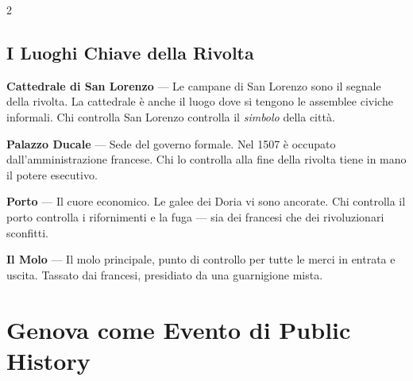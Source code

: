 \begin{multicols}{2}

\subsection{I Luoghi Chiave della Rivolta}


\textbf{Cattedrale di San Lorenzo} — Le campane di San Lorenzo sono
il segnale della rivolta. La cattedrale è anche il luogo dove si tengono
le assemblee civiche informali. Chi controlla San Lorenzo controlla il
\textit{simbolo} della città.


\textbf{Palazzo Ducale} — Sede del governo formale. Nel 1507 è
occupato dall'amministrazione francese. Chi lo controlla alla fine
della rivolta tiene in mano il potere esecutivo.

\columnbreak


\textbf{Porto} — Il cuore economico. Le galee dei Doria vi sono
ancorate. Chi controlla il porto controlla i rifornimenti e la fuga
— sia dei francesi che dei rivoluzionari sconfitti.


\textbf{Il Molo} — Il molo principale, punto di controllo per
tutte le merci in entrata e uscita. Tassato dai francesi, presidiato
da una guarnigione mista.

\end{multicols}

\section{Genova come Evento di Public History}
\label{sec:public-history}

